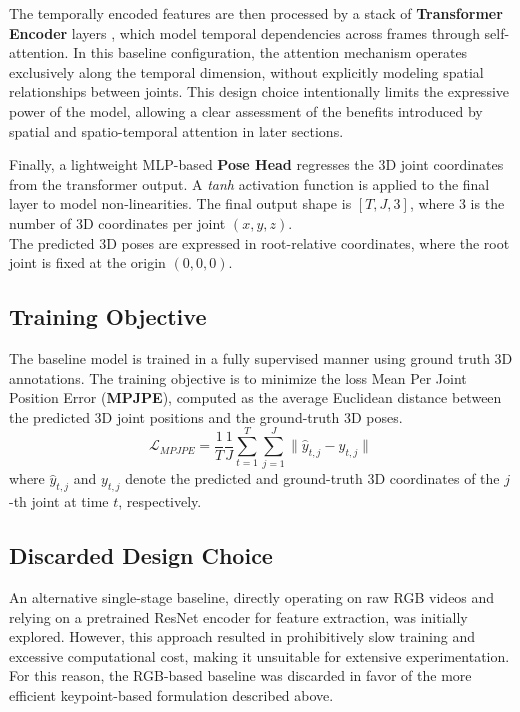 The temporally encoded features are then processed by a stack of \textbf{Transformer Encoder} layers \cite{vaswani2017attention}, which model temporal dependencies across frames 
through self-attention.
In this baseline configuration, the attention mechanism operates exclusively along the temporal dimension, without explicitly modeling spatial relationships between 
joints. This design choice intentionally limits the expressive power of the model, allowing a clear assessment of the benefits introduced by spatial and spatio-temporal 
attention in later sections.

Finally, a lightweight MLP-based \textbf{Pose Head} regresses the 3D joint coordinates from the transformer output.
A \textit{tanh} activation function is applied to the final layer to model non-linearities. The final output shape is $[T, J, 3]$, where $3$ is the number of 3D coordinates per joint $(x, y, z)$.\\
The predicted 3D poses are expressed in root-relative coordinates, where the root joint is fixed at the origin $(0, 0, 0)$.

\subsection{Training Objective}
The baseline model is trained in a fully supervised manner using ground truth 3D annotations.
The training objective is to minimize the loss Mean Per Joint Position Error (\textbf{MPJPE}), computed as the average Euclidean distance between the predicted 3D joint 
positions and the ground-truth 3D poses.
\begin{equation}
    \mathcal{L}_{MPJPE} = \frac{1}{T} \frac{1}{J} \sum_{t=1}^{T} \sum_{j=1}^{J} \| \hat{y}_{t,j} - y_{t,j} \|
\end{equation}
where $\hat{y}_{t,j}$ and $y_{t,j}$ denote the predicted and ground-truth 3D coordinates of the $j$-th joint at time $t$, respectively.

\subsection{Discarded Design Choice}
An alternative single-stage baseline, directly operating on raw RGB videos and relying on a pretrained ResNet encoder \cite{he2016deep} for feature extraction, was initially explored.
However, this approach resulted in prohibitively slow training and excessive computational cost, making it unsuitable for extensive experimentation.
For this reason, the RGB-based baseline was discarded in favor of the more efficient keypoint-based formulation described above.

